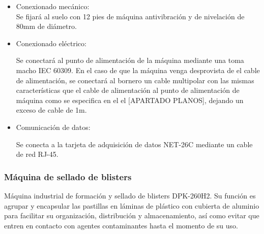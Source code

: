 		\begin{itemize}
				\item{Conexionado mecánico:}\\
				
				Se fijará al suelo con 12 pies de máquina antivibración y de nivelación de 80mm de diámetro.

				\item{Conexionado eléctrico:}

				Se conectará al punto de alimentación de la máquina mediante una  toma macho IEC 60309. En el caso de que la máquina venga desprovista de el cable de alimentación, se conectará al bornero un cable multipolar con las mismas características que el cable de alimentación al punto de alimentación de máquina como se especifica en el el [APARTADO PLANOS], dejando un exceso de cable de 1m. \
				
				\item{Comunicación de datos:}

				Se conecta a la tarjeta de adquisición de datos NET-26C mediante un cable de red RJ-45.
		\end{itemize}

    \newpage

	\subsubsection{Máquina de sellado de blisters }

	
	Máquina industrial de formación y sellado de blisters DPK-260H2. Su función es agrupar y encapsular las pastillas en láminas de plástico con cubierta de aluminio para facilitar su organización, distribución y almacenamiento, así como evitar que entren en contacto con agentes contaminantes hasta el momento de su uso.\\

